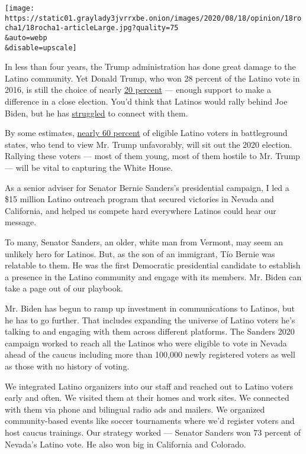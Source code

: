 \texttt{[image: https://static01.graylady3jvrrxbe.onion/images/2020/08/18/opinion/18rocha1/18rocha1-articleLarge.jpg?quality=75\\\&auto=webp\\\&disable=upscale]}

In less than four years, the Trump administration has done great damage
to the Latino community. Yet Donald Trump, who won 28 percent of the
Latino vote in 2016, is still the choice of nearly
\href{https://latinodecisions.com/wp-content/uploads/2020/08/National-and-State-Results-Somos-Unidos-Aug-Svy.pdf}{20
percent} --- enough support to make a difference in a close election.
You'd think that Latinos would rally behind Joe Biden, but he has
\href{https://www.politico.com/news/2020/07/13/biden-latino-vote-360033}{struggled}
to connect with them.

By some estimates,
\href{https://www.nytimes3xbfgragh.onion/2020/05/06/opinion/latino-voters-2020-election.html}{nearly
60 percent} of eligible Latino voters in battleground states, who tend
to view Mr. Trump unfavorably, will sit out the 2020 election. Rallying
these voters --- most of them young, most of them hostile to Mr. Trump
--- will be vital to capturing the White House.

As a senior adviser for Senator Bernie Sanders's presidential campaign,
I led a \$15 million Latino outreach program that secured victories in
Nevada and California, and helped us compete hard everywhere Latinos
could hear our message.

To many, Senator Sanders, an older, white man from Vermont, may seem an
unlikely hero for Latinos. But, as the son of an immigrant, Tío Bernie
was relatable to them. He was the first Democratic presidential
candidate to establish a presence in the Latino community and engage
with its members. Mr. Biden can take a page out of our playbook.

Mr. Biden has begun to ramp up investment in communications to Latinos,
but he has to go further. That includes expanding the universe of Latino
voters he's talking to and engaging with them across different
platforms. The Sanders 2020 campaign worked to reach all the Latinos who
were eligible to vote in Nevada ahead of the caucus including more than
100,000 newly registered voters as well as those with no history of
voting.

We integrated Latino organizers into our staff and reached out to Latino
voters early and often. We visited them at their homes and work sites.
We connected with them via phone and bilingual radio ads and mailers. We
organized community-based events like soccer tournaments where we'd
register voters and host caucus trainings. Our strategy worked ---
Senator Sanders won 73 percent of Nevada's Latino vote. He also won big
in California and Colorado.

